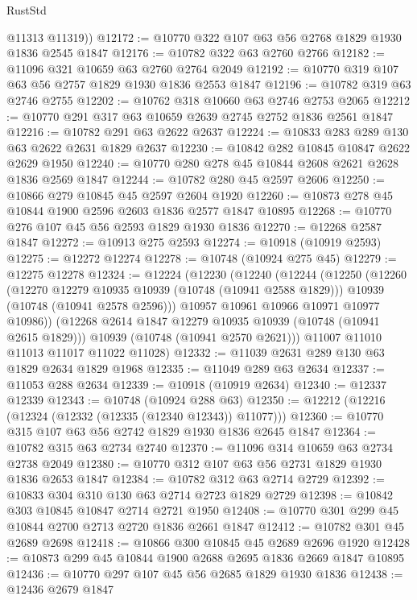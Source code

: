 \begin{lexlean}{RustStd}
\begin{coremodule}
{\begin{coremodule}
{{{{{        @11313
        @11319))
@12172 := @10770 @322 @107 @63 @56 @2768 @1829 @1930 @1836 @2545 @1847
@12176 := @10782 @322 @63 @2760 @2766
@12182 := @11096 @321 @10659 @63 @2760 @2764 @2049
@12192 := @10770 @319 @107 @63 @56 @2757 @1829 @1930 @1836 @2553 @1847
@12196 := @10782 @319 @63 @2746 @2755
@12202 := @10762 @318 @10660 @63 @2746 @2753 @2065
@12212 := @10770 @291 @317 @63 @10659 @2639 @2745 @2752 @1836 @2561 @1847
@12216 := @10782 @291 @63 @2622 @2637
@12224 := @10833 @283 @289 @130 @63 @2622 @2631 @1829 @2637
@12230 := @10842 @282 @10845 @10847 @2622 @2629 @1950
@12240 := @10770 @280 @278 @45 @10844 @2608 @2621 @2628 @1836 @2569 @1847
@12244 := @10782 @280 @45 @2597 @2606
@12250 := @10866 @279 @10845 @45 @2597 @2604 @1920
@12260 := @10873 @278 @45 @10844 @1900 @2596 @2603 @1836 @2577 @1847 @10895
@12268 := @10770 @276 @107 @45 @56 @2593 @1829 @1930 @1836
@12270 := @12268 @2587 @1847
@12272 := @10913 @275 @2593
@12274 := @10918 (@10919 @2593)
@12275 := @12272 @12274
@12278 := @10748 (@10924 @275 @45)
@12279 := @12275 @12278
@12324 := @12224
    (@12230
      (@12240
        (@12244
          (@12250
            (@12260
              (@12270 @12279 @10935 @10939 (@10748 (@10941 @2588 @1829)))
              @10939
              (@10748 (@10941 @2578 @2596)))
            @10957
            @10961
            @10966
            @10971
            @10977
            @10986))
        (@12268 @2614 @1847 @12279 @10935 @10939 (@10748 (@10941 @2615 @1829)))
        @10939
        (@10748 (@10941 @2570 @2621)))
      @11007
      @11010
      @11013
      @11017
      @11022
      @11028)
@12332 := @11039 @2631 @289 @130 @63 @1829 @2634 @1829 @1968
@12335 := @11049 @289 @63 @2634
@12337 := @11053 @288 @2634
@12339 := @10918 (@10919 @2634)
@12340 := @12337 @12339
@12343 := @10748 (@10924 @288 @63)
@12350 := @12212 (@12216 (@12324 (@12332 (@12335 (@12340 @12343)) @11077)))
@12360 := @10770 @315 @107 @63 @56 @2742 @1829 @1930 @1836 @2645 @1847
@12364 := @10782 @315 @63 @2734 @2740
@12370 := @11096 @314 @10659 @63 @2734 @2738 @2049
@12380 := @10770 @312 @107 @63 @56 @2731 @1829 @1930 @1836 @2653 @1847
@12384 := @10782 @312 @63 @2714 @2729
@12392 := @10833 @304 @310 @130 @63 @2714 @2723 @1829 @2729
@12398 := @10842 @303 @10845 @10847 @2714 @2721 @1950
@12408 := @10770 @301 @299 @45 @10844 @2700 @2713 @2720 @1836 @2661 @1847
@12412 := @10782 @301 @45 @2689 @2698
@12418 := @10866 @300 @10845 @45 @2689 @2696 @1920
@12428 := @10873 @299 @45 @10844 @1900 @2688 @2695 @1836 @2669 @1847 @10895
@12436 := @10770 @297 @107 @45 @56 @2685 @1829 @1930 @1836
@12438 := @12436 @2679 @1847
}}}}}
\end{coremodule}}
\end{coremodule}
\end{lexlean}
